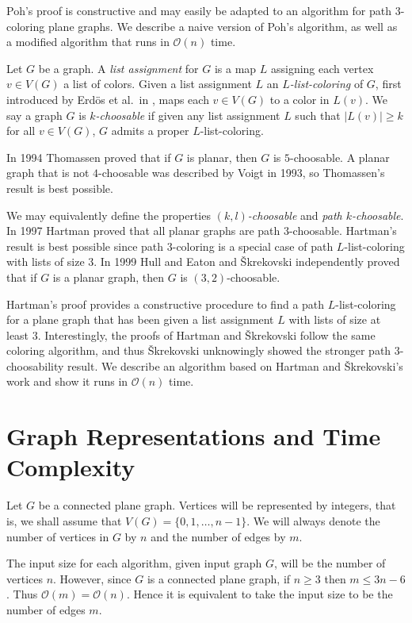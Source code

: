 \documentclass[letterpaper, 12pt]{article}
\theoremstyle{thm}
\begin{document}
Poh's proof is constructive and may easily be adapted to an algorithm for path
$3$-coloring plane graphs. We describe a naive version of Poh's algorithm,
as well as a modified algorithm that runs in $\mathcal{O}(n)$ time.

Let $G$ be a graph. A \textit{list assignment} for $G$ is a map $L$ assigning
each vertex $v\in V(G)$ a list of colors. Given a list assignment $L$ an
\textit{$L$-list-coloring} of $G$, first introduced
by Erd{\"o}s et al.\ in \cite{erdos}, maps each $v\in V(G)$ to a color in $L(v)$.
We say a graph $G$ is \textit{$k$-choosable} if given any list assignment $L$ such that
$\big|L(v)\big|\ge k$ for all $v\in V(G)$, $G$ admits a proper $L$-list-coloring.

In 1994 Thomassen \cite{thomassen} proved that if $G$ is planar, then $G$ is
$5$-choosable. A planar graph that is not $4$-choosable was
described by Voigt \cite{voigt} in 1993, so Thomassen's result is best possible.

We may equivalently define the properties \textit{$(k,l)$-choosable} and
\textit{path $k$-choosable}. In 1997 Hartman \cite{hartman} proved that all
planar graphs are path $3$-choosable. Hartman's result is best possible since
path $3$-coloring is a special case of path $L$-list-coloring with lists of size
$3$. In 1999 Hull and Eaton \cite{hull} and \v{S}krekovski \cite{skrekovski}
independently proved that if $G$ is a planar graph, then $G$ is
$(3,2)$-choosable.

Hartman's proof provides a constructive procedure to find a path
$L$-list-coloring for a plane graph that has been given a list assignment $L$
with lists of size at least $3$. Interestingly, the proofs of Hartman and
\v{S}krekovski follow the same coloring algorithm, and thus \v{S}krekovski unknowingly
showed the stronger path $3$-choosability result. We describe an algorithm
based on Hartman and \v{S}krekovski's work and show it runs in $\mathcal{O}(n)$
time.

\section{Graph Representations and Time Complexity}

Let $G$ be a connected plane graph. Vertices will be represented by integers, that is, we
shall assume that $V(G)=\{0,1,\ldots,n-1\}$. We will always denote the
number of vertices in $G$ by $n$ and the number of edges by $m$.

The input size for each algorithm, given input graph $G$, will be the
number of vertices $n$. However, since $G$ is a connected plane graph, if $n\ge 3$ then
$m\le 3n-6$. Thus $\mathcal{O}(m)= \mathcal{O}(n)$. Hence it is equivalent to
take the input size to be the number of edges $m$.
\end{document}
